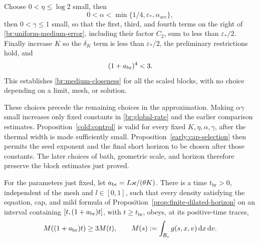 Choose \(0<\eta\le\log2\) small, then
\[
0<\alpha<\min\{1/4,\varepsilon_*,\alpha_{\mathrm{acc}}\},
\]
then \(0<\gamma\le1\) small, so that the first, third, and fourth terms
on the right of \eqref{br:uniform-medium-error}, including their factor
\(C_2\), sum to less than \(\varepsilon_*/2\).
Finally increase \(K\) so the \(\delta_K\) term is less than
\(\varepsilon_*/2\), the preliminary restrictions hold, and
\begin{equation}\label{br:growth-exponent}
(1+a_{\rm br})^4<3.
\end{equation}
This establishes \eqref{br:medium-closeness} for all the scaled blocks,
with no choice depending on a limit, mesh, or solution.

These choices precede the remaining choices in the approximation.
Making \(\alpha\gamma\) small increases only fixed constants in
\eqref{br:global-rate} and the earlier comparison estimates.
Proposition~\ref{cold:control} is valid for every fixed
\(K,\eta,\alpha,\gamma\), after the thermal width is made sufficiently
small. Proposition~\ref{early:cap-selection} then permits the seed
exponent and the final short horizon to be chosen after those constants.
The later choices of bath, geometric scale, and horizon therefore
preserve the block estimates just proved.

\begin{lemma}\label{br:block-growth}
For the parameters just fixed, let \(a_{\rm br}=L\varkappa/(\theta K)\).
There is a time \(t_{\mathrm{br}}>0\), independent of the mesh and
\(l\in[0,1]\), such that every density satisfying the equation, cap,
and mild formula of Proposition~\ref{prop:finite-dilated-horizon} on
an interval containing \([t,(1+a_{\rm br})t]\), with \(t\ge t_{\mathrm{br}}\),
obeys, at its positive-time traces,
\begin{equation}\label{br:mass-growth}
 M((1+a_{\rm br})t)\ge3M(t),\qquad
 M(s):=\int_{\mathcal B_s}g(s,x,v)\,\mathrm d x\,\mathrm d v.
\end{equation}
\end{lemma}

